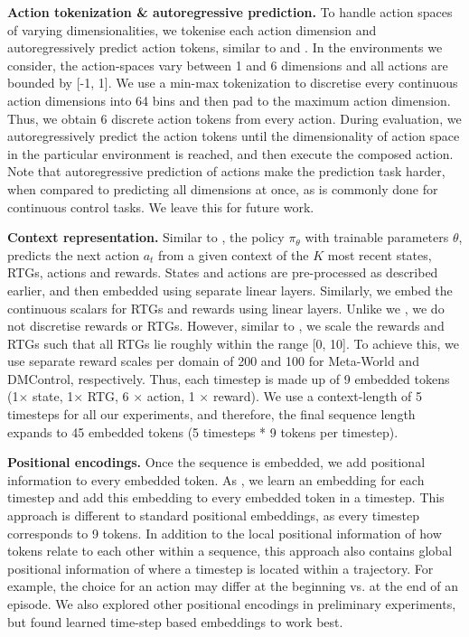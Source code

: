 \textbf{Action tokenization \& autoregressive prediction.} 
To handle action spaces of varying dimensionalities, we tokenise each action dimension and autoregressively predict action tokens, similar to \citet{Reed:22} and \citet{Brohan:22}. 
In the environments we consider, the action-spaces vary between 1 and 6 dimensions and all actions are bounded by [-1, 1]. We use a min-max tokenization to discretise every continuous action dimensions into 64 bins and then pad to the maximum action dimension. Thus, we obtain 6 discrete action tokens from every action. During evaluation, we autoregressively predict the action tokens until the dimensionality of action space in the particular environment is reached, and then execute the composed action. Note that autoregressive prediction of actions make the prediction task harder, when compared to predicting all dimensions at once, as is commonly done for
 continuous control tasks. We leave this for future work. 

\textbf{Context representation.} 
Similar to \citet{Lee:22}, the policy $\pi_{\theta}$ with trainable parameters $\theta$, predicts the next action $a_t$ from a given context of the $K$ most recent states, RTGs, actions and rewards.
States and actions are pre-processed as described earlier, and then embedded using separate linear layers. Similarly, we embed the continuous scalars for RTGs and rewards using linear layers. Unlike we \citet{Lee:22}, we do not discretise rewards or RTGs. However, similar to \citet{Chen:21}, we scale the rewards and RTGs such that all RTGs lie roughly within the range [0, 10]. To achieve this, we use separate reward scales per domain of 200 and 100 for Meta-World and DMControl, respectively. Thus, each timestep is made up of 9 embedded tokens (1$\times$ state, 1$\times$ RTG, 6 $\times$ action, 1 $\times$ reward). We use a context-length of 5 timesteps for all our experiments, and therefore, the final sequence length expands to 45 embedded tokens (5 timesteps * 9 tokens per timestep). 

\textbf{Positional encodings.} Once the sequence is embedded, we add positional information to every embedded token. 
As \citet{Chen:21}, we learn an embedding for each timestep and add this embedding to every embedded token in a timestep.
This approach is different to standard positional embeddings, as every timestep corresponds to 9 tokens. 
In addition to the local positional information of how tokens relate to each other within a sequence, this approach also contains global positional information of where a timestep is located within a trajectory. 
For example, the choice for an action may differ at the beginning vs. at the end of an episode. 
We also explored other positional encodings in preliminary experiments, but found learned time-step based embeddings to work best. 

